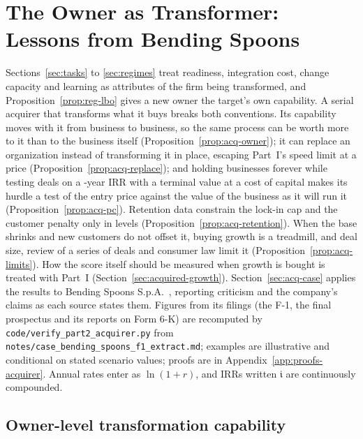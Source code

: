 \section{The Owner as Transformer: Lessons from Bending Spoons}\label{sec:acquirer}

Sections~\ref{sec:tasks} to \ref{sec:regimes} treat readiness, integration cost, change capacity and learning as attributes of the firm being transformed, and Proposition~\ref{prop:reg-lbo} gives a new owner the target's own capability. A serial acquirer that transforms what it buys breaks both conventions. Its capability moves with it from business to business, so the same process can be worth more to it than to the business itself (Proposition~\ref{prop:acq-owner}); it can replace an organization instead of transforming it in place, escaping Part~I's speed limit at a price (Proposition~\ref{prop:acq-replace}); and holding businesses forever while testing deals on a \acqTirr-year IRR with a terminal value at a cost of capital makes its hurdle a test of the entry price against the value of the business as it will run it (Proposition~\ref{prop:acq-pc}). Retention data constrain the lock-in cap and the customer penalty only in levels (Proposition~\ref{prop:acq-retention}). When the base shrinks and new customers do not offset it, buying growth is a treadmill, and deal size, review of a series of deals and consumer law limit it (Proposition~\ref{prop:acq-limits}). How the score itself should be measured when growth is bought is treated with Part~I (Section~\ref{sec:acquired-growth}). Section~\ref{sec:acq-case} applies the results to Bending Spoons S.p.A.\ \citep{bendingspoons2026f1,bendingspoons2026prospectus,bendingspoons2026sixk}, reporting criticism and the company's claims as each source states them. Figures from its filings (the F-1, the final prospectus and its reports on Form 6-K) are recomputed by \texttt{code/verify\_part2\_acquirer.py} from \texttt{notes/case\_bending\_spoons\_f1\_extract.md}; examples are illustrative and conditional on stated scenario values; proofs are in Appendix~\ref{app:proofs-acquirer}. Annual rates enter as $\ln(1+r)$, and IRRs written $\mathfrak i$ are continuously compounded.

\subsection{Owner-level transformation capability}\label{sec:acq-owner}

